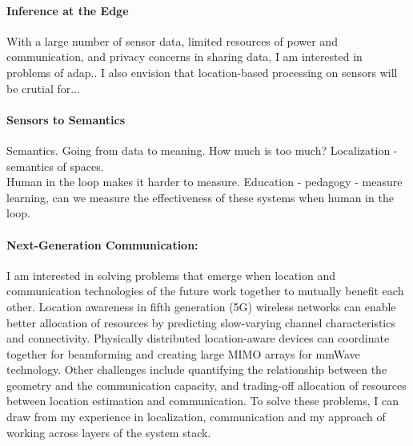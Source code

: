 \documentclass[11pt]{article}
\begin{document}
\paragraph{Inference at the Edge}
With a large number of sensor data, limited resources of power and communication, and privacy concerns in sharing data, I am interested in problems of adap..
I also envision that location-based processing on sensors will be crutial for...


\paragraph{Sensors to Semantics}
Semantics. Going from data to meaning. 
How much is too much?
Localization - semantics of spaces.\\
Human in the loop makes it harder to measure. Education - pedagogy - measure learning, can we measure the effectiveness of these systems when human in the loop.

\paragraph{Next-Generation Communication: }
I am interested in solving problems that emerge when location and communication technologies of the future work together to mutually benefit each other. 
Location awareness in fifth generation (5G) wireless networks can enable better allocation of resources by predicting slow-varying channel characteristics and connectivity. Physically distributed location-aware devices can coordinate together for beamforming and creating large MIMO arrays for mmWave technology. %
Other challenges include quantifying the relationship between the geometry and the communication capacity, and trading-off allocation of resources between location estimation and communication. To solve these problems, I can draw from my experience in localization, communication and my approach of working across layers of the system stack. 



\end{document}
